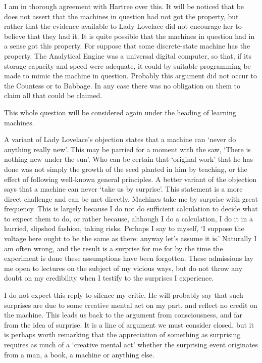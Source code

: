     I am in thorough agreement with Hartree over this. It will be noticed that be does not assert that the machines in question had not got the property, but rather that the evidence available to Lady Lovelace did not encourage her to believe that they had it. It is quite possible that the machines in question had in a sense got this property. For suppose that some discrete-state machine has the property. The Analytical Engine was a universal digital computer, so that, if its storage capacity and speed were adequate, it could by suitable programming be made to mimic the machine in question. Probably this argument did not occur to the Countess or to Babbage. In any case there was no obligation on them to claim all that could be claimed.

    This whole question will be considered again under the heading of learning machines.

    A variant of Lady Lovelace's objection states that a machine can ‘never do anything really new'. This may be parried for a moment with the saw, ‘There is nothing new under the sun'. Who can be certain that ‘original work' that he has done was not simply the growth of the seed planted in him by teaching, or the effect of following well-known general principles. A better variant of the objection says that a machine can never ‘take us by surprise'. This statement is a more direct challenge and can be met directly. Machines take me by surprise with great frequency. This is largely because I do not do sufficient calculation to decide what to expect them to do, or rather because, although I do a calculation, I do it in a hurried, slipshod fashion, taking risks. Perhaps I say to myself, ‘I suppose the voltage here ought to be the same as there: anyway let's assume it is.' Naturally I am often wrong, and the result is a surprise for me for by the time the experiment is done these assumptions have been forgotten. These admissions lay me open to lectures on the subject of my vicious ways, but do not throw any doubt on my credibility when I testify to the surprises I experience.

    I do not expect this reply to silence my critic. He will probably say that such surprises are due to some creative mental act on my part, and reflect no credit on the machine. This leads us back to the argument from consciousness, and far from the idea of surprise. It is a line of argument we must consider closed, but it is perhaps worth remarking that the appreciation of something as surprising requires as much of a ‘creative mental act' whether the surprising event originates from a man, a book, a machine or anything else.

